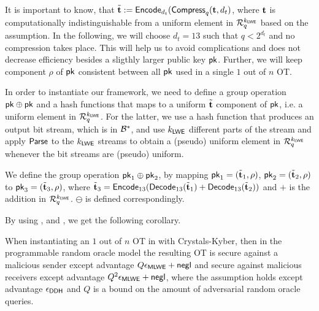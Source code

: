 It is important to know, that $\tilde{{\mathbf t}}:=\mathsf{Encode}_{d_t}(\mathsf{Compress}_q({\mathbf t}, d_t)$, where ${\mathbf t}$ is computationally indistinguishable from a uniform element in $\mathcal R_q^{k_{\mathsf{LWE}}}$ based on the \MLWE assumption. In the following, we will choose $d_t=13$ such that $q<2^{d_t}$ and no compression takes place. This will help us to avoid complications and does not decrease efficiency besides a sligthly larger public key $\mathsf{pk}$. Further, we will keep component $\rho$ of $\mathsf{pk}$ consistent between all $\mathsf{pk}$ used in a single $1$ out of $n$ OT.

In order to instantiate our framework, we need to define a group operation $\mathsf{pk}\oplus\mathsf{pk}$ and a hash functions that maps to a uniform $\tilde{{\mathbf t}}$ component of $\mathsf{pk}$, i.e. a uniform element in $\mathcal R_q^{k_{\mathsf{LWE}}}$. For the latter, we use a hash function that produces an output bit stream, which is in $\mathcal{B}^{*}$, and use $k_{\mathsf{LWE}}$ different parts of the stream and apply $\mathsf{Parse}$ to the $k_{\mathsf{LWE}}$ streams to obtain a (pseudo) uniform element in $\mathcal R_q^{k_{\mathsf{LWE}}}$ whenever the bit streams are (pseudo) uniform.

We define the group operation $\mathsf{pk}_1\oplus\mathsf{pk}_2$, by mapping $\mathsf{pk}_1=(\tilde{{\mathbf t}}_1,\rho)$, $\mathsf{pk}_2=(\tilde{{\mathbf t}}_2,\rho)$ to $\mathsf{pk}_3=(\tilde{{\mathbf t}}_3, \rho)$, where $\tilde{{\mathbf t}}_3=\mathsf{Encode}_{13}(\mathsf{Decode}_{13}(\tilde{{\mathbf t}}_1)+\mathsf{Decode}_{13}(\tilde{{\mathbf t}}_2))$ and $+$ is the addition in $\mathcal R_q^{k_{\mathsf{LWE}}}$. $\ominus$ is defined correspondingly. 

By using ,  and , we get the following corollary.
 
\begin{corollary}
When instantiating an $1$ out of $n$ OT in  with Crystals-Kyber, then in the programmable random oracle model the resulting OT is secure against a malicious sender except advantage $Q\epsilon_{\mathsf{MLWE}}+\mathsf{negl}$  and secure against malicious receivers except advantage $Q^2\epsilon_{\mathsf{MLWE}}+\mathsf{negl}$, where the \MLWE assumption holds except advantage $\epsilon_{\mathsf{DDH}}$ and $Q$ is a bound on the amount of adversarial random oracle queries.
\end{corollary}